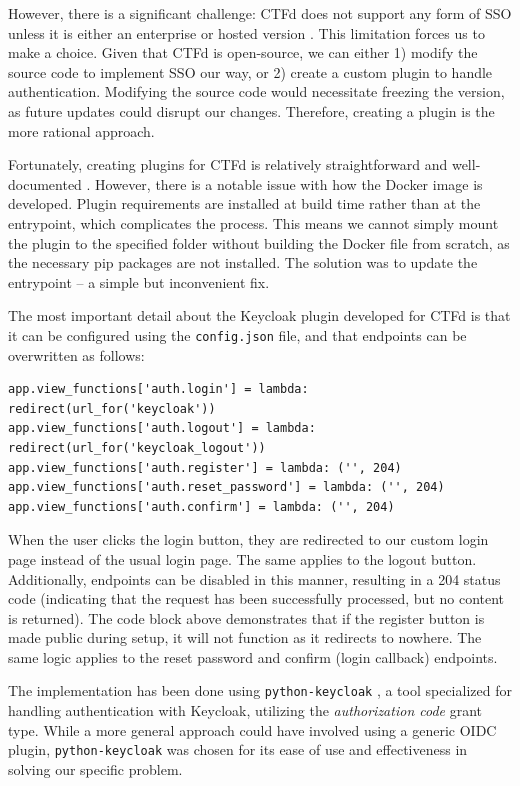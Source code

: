 However, there is a significant challenge: CTFd does not support any form of SSO unless it is either an enterprise or hosted version \parencite{ctfd_sso}. This limitation forces us to make a choice. Given that CTFd is open-source, we can either 1) modify the source code to implement SSO our way, or 2) create a custom plugin to handle authentication. Modifying the source code would necessitate freezing the version, as future updates could disrupt our changes. Therefore, creating a plugin is the more rational approach.

Fortunately, creating plugins for CTFd is relatively straightforward and well-documented \parencite{ctfd_plugins}. However, there is a notable issue with how the Docker image is developed. Plugin requirements are installed at build time rather than at the entrypoint, which complicates the process. This means we cannot simply mount the plugin to the specified folder without building the Docker file from scratch, as the necessary pip packages are not installed. The solution was to update the entrypoint -- a simple but inconvenient fix.

The most important detail about the Keycloak plugin developed for CTFd is that it can be configured using the \texttt{config.json} file, and that endpoints can be overwritten as follows:

\begin{verbatim}
app.view_functions['auth.login'] = lambda: redirect(url_for('keycloak'))
app.view_functions['auth.logout'] = lambda: redirect(url_for('keycloak_logout'))
app.view_functions['auth.register'] = lambda: ('', 204)
app.view_functions['auth.reset_password'] = lambda: ('', 204)
app.view_functions['auth.confirm'] = lambda: ('', 204)
\end{verbatim}

When the user clicks the login button, they are redirected to our custom login page instead of the usual login page. The same applies to the logout button. Additionally, endpoints can be disabled in this manner, resulting in a 204 status code (indicating that the request has been successfully processed, but no content is returned). The code block above demonstrates that if the register button is made public during setup, it will not function as it redirects to nowhere. The same logic applies to the reset password and confirm (login callback) endpoints.

The implementation has been done using \texttt{python-keycloak} \parencite{python_keycloak}, a tool specialized for handling authentication with Keycloak, utilizing the \textit{authorization code} grant type. While a more general approach could have involved using a generic OIDC plugin, \texttt{python-keycloak} was chosen for its ease of use and effectiveness in solving our specific problem.

